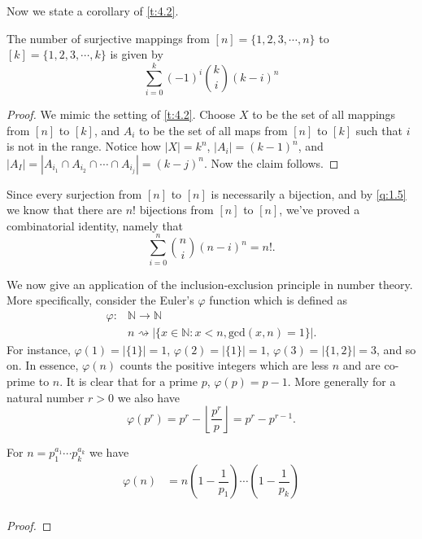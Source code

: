 Now we state a corollary of \cref{t:4.2}.
\begin{claim}
The number of surjective mappings from $[n]=\{1,2,3,\cdots,n\}$ to $[k]=\{1,2,3,\cdots,k\}$ is given by \[
    \sum_{i=0}^{k}(-1)^i\binom{k}{i}(k-i)^n
    \]
\end{claim}
\begin{proof}
We mimic the setting of \cref{t:4.2}. Choose $X$ to be the set of all mappings from $[n]$ to $[k]$, and $A_i$ to be the set of all maps from $[n]$ to $[k]$ such that $i$ is not in the range. Notice how $|X|=k^n$, $|A_i|=(k-1)^n$, and $|A_I| = |A_{i_1}\cap A_{i_2}\cap \cdots \cap A_{i_j}|=(k-j)^n$. Now the claim follows. 
\end{proof}

\begin{remark}
Since every surjection from $[n]$ to $[n]$ is necessarily a bijection, and by \cref{q:1.5} we know that there are $n!$ bijections from $[n]$ to $[n]$, we've proved a combinatorial identity, namely that
\[
\sum_{i=0}^{n}\binom{n}{i}(n-i)^n=n!.
\]
\end{remark}
We now give an application of the inclusion-exclusion principle in number theory. More specifically, consider the Euler's $\varphi$ function which is defined as
\begin{align*}
    \varphi: &\mathbb{N}\to \mathbb{N} \\
    &n\rightsquigarrow |\{x\in\mathbb{N}: x< n, \text{gcd}(x,n)=1\}|.
\end{align*}
For instance, $\varphi(1)=|\{1\}|=1$, $\varphi(2)=|\{1\}|=1$, $\varphi(3)=|\{1,2\}|=3$, and so on. In essence, $\varphi(n)$ counts the positive integers which are less $n$ and are co-prime to $n$. It is clear that for a prime $p$, $\varphi(p) = p-1$. More generally for a natural number $r>0$ we also have
\[
\varphi(p^r) = p^r-\left\lfloor \dfrac{p^r}{p}\right\rfloor = p^r-p^{r-1}.
\]

\begin{theorem}
For $n=p_1^{a_1}\cdots p_k^{a_k}$ we have 
\begin{align*}
\varphi(n) &= n\left(1-\dfrac{1}{p_1}\right)\cdots\left(1-\dfrac{1}{p_k}\right) \\
\end{align*}
\end{theorem}
\begin{proof}
\end{proof}